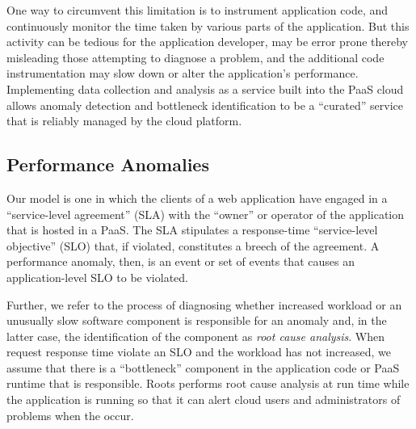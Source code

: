 One way to circumvent this 
limitation is to instrument application code, and continuously monitor the time taken by various
parts of the application. But this activity can be tedious for the application developer, 
may be error prone thereby misleading those attempting to
diagnose a problem, and
the additional code instrumentation may slow down or alter the application's
performance. 
Implementing data collection and analysis as a service built into the PaaS cloud allows 
anomaly detection and bottleneck identification to be a ``curated'' service that is 
reliably managed by the cloud platform.

\subsection{Performance Anomalies}


Our model is
one in which the clients of a web application have engaged in a
``service-level agreement'' (SLA)
with the ``owner'' or operator of the application that is hosted in a PaaS.  The SLA
stipulates a response-time ``service-level objective'' (SLO) that, if violated, constitutes a breech of the
agreement.  A performance anomaly, then, is an event or set of events that
causes an application-level SLO to be violated.

Further, we refer to the process
of diagnosing whether increased workload or an unusually slow software component is responsible for
an anomaly and, in the latter case, the identification of the component
as \textit{root cause analysis}.  When request response time violate an SLO
and the workload has not increased, we assume that there is a ``bottleneck''
component in the application code or PaaS runtime that is responsible.  Roots
performs root cause analysis at run time while the application is running so
that it can alert cloud users and administrators of problems when the occur.

